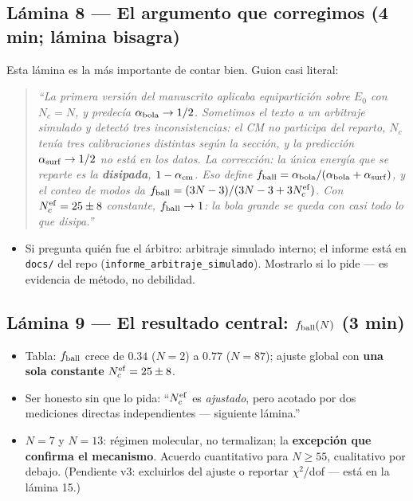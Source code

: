 \documentclass[11pt]{article}
\newcommand{\clave}[1]{\textcolor{red!60!black}{\textbf{#1}}}
\newcommand{\decir}[1]{\begin{quote}\itshape``#1''\end{quote}}
\begin{document}
\subsection*{Lámina 8 --- El argumento que corregimos (4 min; lámina
bisagra)}
Esta lámina es la más importante de contar bien. Guion casi literal:
\decir{La primera versión del manuscrito aplicaba equipartición sobre
$E_0$ con $N_c=N$, y predecía $\alpha_{\rm bola}\to1/2$. Sometimos el
texto a un arbitraje simulado y detectó tres inconsistencias: el CM no
participa del reparto, $N_c$ tenía tres calibraciones distintas según la
sección, y la predicción $\alpha_{\rm surf}\to1/2$ no está en los datos.
La corrección: la única energía que se reparte es la \textbf{disipada},
$1-\alpha_{\rm cm}$. Eso define
$f_{\rm ball}=\alpha_{\rm bola}/(\alpha_{\rm bola}+\alpha_{\rm surf})$,
y el conteo de modos da $f_{\rm ball}=(3N-3)/(3N-3+3N_c^{\rm ef})$. Con
$N_c^{\rm ef}=25\pm8$ constante, $f_{\rm ball}\to1$: la bola grande se
queda con casi todo lo que disipa.}
\begin{itemize}[leftmargin=1.4em]
    \item Si pregunta quién fue el árbitro: arbitraje simulado interno;
    el informe está en \texttt{docs/} del repo
    (\texttt{informe\_arbitraje\_simulado}). Mostrarlo si lo pide --- es
    evidencia de método, no debilidad.
\end{itemize}

\subsection*{Lámina 9 --- El resultado central: $f_{\rm ball}(N)$ (3 min)}
\begin{itemize}[leftmargin=1.4em]
    \item Tabla: $f_{\rm ball}$ crece de $0.34$ ($N{=}2$) a $0.77$
    ($N{=}87$); ajuste global con \clave{una sola constante}
    $N_c^{\rm ef}=25\pm8$.
    \item Ser honesto sin que lo pida: ``$N_c^{\rm ef}$ es
    \emph{ajustado}, pero acotado por dos mediciones directas
    independientes --- siguiente lámina.''
    \item $N=7$ y $N=13$: régimen molecular, no termalizan; la
    \clave{excepción que confirma el mecanismo}. Acuerdo cuantitativo
    para $N\ge55$, cualitativo por debajo. (Pendiente v3: excluirlos del
    ajuste o reportar $\chi^2$/dof --- está en la lámina 15.)
\end{itemize}
\end{document}
